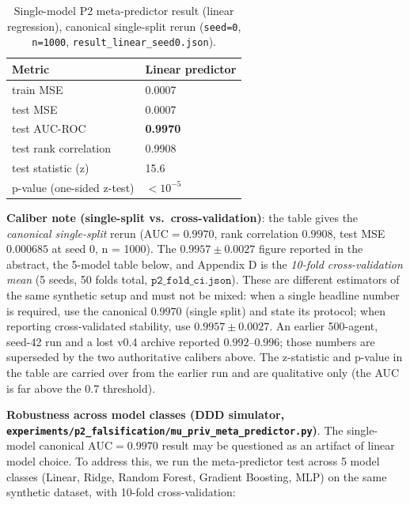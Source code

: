 \begin{table}[h]
\centering
\caption{Single-model P2 meta-predictor result (linear regression), canonical single-split rerun (\texttt{seed=0}, \texttt{n=1000}, \texttt{result\_linear\_seed0.json}).}
\label{tab:p2-single}
\begin{tabular}{ll}
\toprule
Metric & Linear predictor \\
\midrule
train MSE & 0.0007 \\
test MSE & 0.0007 \\
test AUC-ROC & \textbf{0.9970} \\
test rank correlation & 0.9908 \\
test statistic (z) & 15.6 \\
p-value (one-sided z-test) & $< 10^{-5}$ \\
\bottomrule
\end{tabular}
\end{table}

\textbf{Caliber note (single-split vs.\ cross-validation)}: the table gives the \emph{canonical single-split} rerun ($\text{AUC}=0.9970$, rank correlation $0.9908$, test MSE $0.000685$ at seed 0, n = 1000). The $0.9957\pm0.0027$ figure reported in the abstract, the 5-model table below, and Appendix D is the \emph{10-fold cross-validation mean} (5 seeds, 50 folds total, $\texttt{p2\_fold\_ci.json}$). These are different estimators of the same synthetic setup and must not be mixed: when a single headline number is required, use the canonical $0.9970$ (single split) and state its protocol; when reporting cross-validated stability, use $0.9957\pm0.0027$. An earlier 500-agent, seed-42 run and a lost v0.4 archive reported $0.992$--$0.996$; those numbers are superseded by the two authoritative calibers above. The z-statistic and p-value in the table are carried over from the earlier run and are qualitative only (the AUC is far above the 0.7 threshold).

\textbf{Robustness across model classes (DDD simulator, \texttt{experiments/p2\_falsification/mu\_priv\_meta\_predictor.py})}. The single-model canonical $\text{AUC}=0.9970$ result may be questioned as an artifact of linear model choice. To address this, we run the meta-predictor test across 5 model classes (Linear, Ridge, Random Forest, Gradient Boosting, MLP) on the same synthetic dataset, with 10-fold cross-validation:

